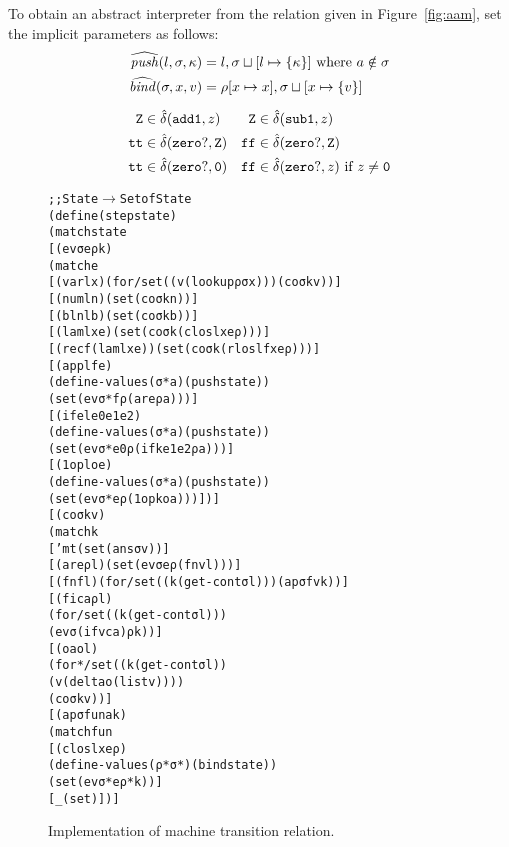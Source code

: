 \documentclass{llncs}
\begin{document}
To obtain an abstract interpreter from the relation given in
Figure~\ref{fig:aam}, set the implicit parameters as follows:
\begin{gather}
\begin{align*}
\widehat{\mathit{push}}(l,\sigma,\kappa) &= l,\sigma\sqcup[l\mapsto\{\kappa\}]
\mbox{ where }a \notin\sigma
\\
\widehat{\mathit{bind}}(\sigma,x,v) &= \rho[x\mapsto x],\sigma\sqcup[x\mapsto\{v\}]
\end{align*}
\\[2mm]
\begin{align*}
{\tt Z} &\in \hat\delta({\tt add1},z) &
{\tt Z} &\in \hat\delta({\tt sub1},z)\\
{\tt tt} &\in \hat\delta({\tt zero?},{\tt Z}) &
{\tt ff} &\in \hat\delta({\tt zero?},{\tt Z})\\
{\tt tt} &\in \hat\delta({\tt zero?},{\tt 0}) &
{\tt ff} &\in \hat\delta({\tt zero?},z)\text{ if }z\neq {\tt 0}\\
\end{align*}
\end{gather}


\begin{figure}
\begin{alltt}
  ;; State \(\rightarrow\) Setof State
  (define (step state)
    (match state
      [(ev σ e ρ k)
       (match e
         [(var l x)           (for/set ((v (lookup ρ σ x))) (co σ k v))]
         [(num l n)           (set (co σ k n))]
         [(bln l b)           (set (co σ k b))]
         [(lam l x e)         (set (co σ k (clos l x e ρ)))]
         [(rec f (lam l x e)) (set (co σ k (rlos l f x e ρ)))]
         [(app l f e)
          (define-values (σ* a) (push state))
          (set (ev σ* f ρ (ar e ρ a)))]
         [(ife l e0 e1 e2)
          (define-values (σ* a) (push state))
          (set (ev σ* e0 ρ (ifk e1 e2 ρ a)))]
         [(1op l o e)
          (define-values (σ* a) (push state))
          (set (ev σ* e ρ (1opk o a)))])]
      [(co σ k v)
       (match k
         ['mt (set (ans σ v))]
         [(ar e ρ l) (set (ev σ e ρ (fn v l)))]
         [(fn f l)   (for/set ((k (get-cont σ l))) (ap σ f v k))]
         [(fi c a ρ l)
          (for/set ((k (get-cont σ l)))
            (ev σ (if v c a) ρ k))]
         [(oa o l)
          (for*/set ((k (get-cont σ l))
                     (v (delta o (list v))))
            (co σ k v))]
      [(ap σ fun a k)
       (match fun
         [(clos l x e ρ)
          (define-values (ρ* σ*) (bind state))
          (set (ev σ* e ρ* k))]
         [_ (set)])]
\end{alltt}
\caption{Implementation of machine transition relation.}
\end{figure}
\end{document}
